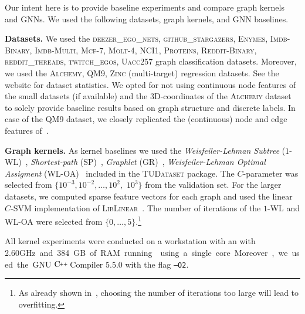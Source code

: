 \documentclass{article}
\newcommand{\xhdr}[1]{{\noindent\bfseries #1}}
\theoremstyle{definition}
\newcommand{\CC}[1][]{$\text{C\hspace{-.25ex}}^{_{_{_{++}}}}
	\ifthenelse{\equal{#1}{}}{}{\text{\hspace{-.625ex}#1}}$}
\newcommand{\new}[1]{\emph{#1}}
\begin{document}
Our intent here is to provide baseline experiments and compare graph kernels and GNNs. We used the following datasets, graph kernels, and GNN baselines.

\xhdr{Datasets.} We used the \textsc{deezer\_ego\_nets}, \textsc{github\_stargazers}, \textsc{Enymes}, \textsc{Imdb-Binary}, \textsc{Imdb-Multi}, \textsc{Mcf-7}, \textsc{Molt-4},    \textsc{NCI1}, \textsc{Proteins},
\textsc{Reddit-Binary}, \textsc{reddit\_threads}, \textsc{twitch\_egos}, \textsc{Uacc257} graph classification datasets. Moreover, we used the \textsc{Alchemy}, \textsc{QM9}, \textsc{Zinc} (multi-target) regression datasets. See the website for dataset statistics. We opted for not using continuous node features of the small datasets (if available) and the 3D-coordinates of the \textsc{Alchemy} dataset to solely provide baseline results based on graph structure and discrete labels. In case of the \textsc{QM9} dataset, we closely replicated the (continuous) node and edge features of~\citet{Gil+2017}.


\xhdr{Graph kernels.} As kernel baselines we used the \new{Weisfeiler-Lehman Subtree} (\textsc{$1$-WL})~\cite{She+2011}, \new{Shortest-path} (\textsc{SP})~\cite{Bor+2005}, \new{Graphlet} (\textsc{GR})~\cite{She+2009}, \new{Weisfeiler-Lehman Optimal Assigment} (\textsc{WL-OA})~\cite{Kri+2016} included in the \textsc{TUDataset} package. The $C$-parameter was selected from $\{10^{-3}, 10^{-2}, \dotsc, 10^{2},$ $10^{3}\}$ from the validation set. For the larger datasets, we computed sparse feature vectors for each graph and used the linear $C$-SVM implementation of \textsc{LibLinear}~\cite{Fan+2008}. The number of iterations of the \textsc{$1$-WL} and \textsc{WL-OA} were selected from $\{0,\dotsc,5\}$.\footnote{As already shown in~\cite{She+2011}, choosing the number of iterations too large will lead to overfitting.}

All kernel experiments were conducted on a workstation with an  with 2.60\si GHz and 384\si GB of RAM running  using a single core. Moreover, we used the GNU \CC Compiler 5.5.0 with the flag \texttt{--O2}. 
\end{document}
